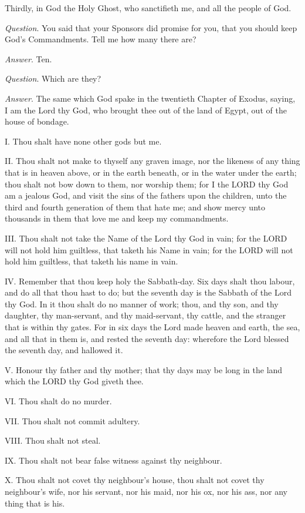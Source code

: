 Thirdly, in God the Holy Ghost, who sanctifieth me,
and all the people of God.

\emph{Question}. You said that your Sponsors did
promise for you, that you should keep God's Commandments. Tell me how
many there are?

\emph{Answer}. Ten.

\emph{Question}. Which are they?

\emph{Answer}. The same which God spake in the
twentieth Chapter of Exodus, saying, I am the Lord thy God, who brought
thee out of the land of Egypt, out of the house of bondage.

I. Thou shalt have none other gods but me.

II. Thou shalt not make to thyself any graven image,
nor the likeness of any thing that is in heaven above, or in the earth
beneath, or in the water under the earth; thou shalt not bow down to them,
nor worship them; for I the LORD thy God am a jealous
God, and visit the sins of the fathers upon the children, unto the third
and fourth generation of them that hate me; and show mercy unto thousands
in them that love me and keep my commandments.

III. Thou shalt not take the Name of the Lord thy God
in vain; for the LORD will not hold him guiltless,
that taketh his Name in vain; for the LORD will
not hold him guiltless, that taketh his name in vain.

IV. Remember that thou keep holy the Sabbath-day. Six
days shalt thou labour, and do all that thou hast to do; but the seventh
day is the Sabbath of the Lord thy God. In it thou shalt do no manner
of work; thou, and thy son, and thy daughter, thy man-servant, and thy
maid-servant, thy cattle, and the stranger that is within thy gates. For
in six days the Lord made heaven and earth, the sea, and all that in them
is, and rested the seventh day: wherefore the Lord blessed the seventh
day, and hallowed it.

V. Honour thy father and thy mother; that thy days may
be long in the land which the LORD thy God giveth
thee.

VI. Thou shalt do no murder.

VII. Thou shalt not commit adultery.

VIII. Thou shalt not steal.

IX. Thou shalt not bear false witness against thy neighbour.

X. Thou shalt not covet thy neighbour's house, thou
shalt not covet thy neighbour's wife, nor his servant, nor his maid, nor
his ox, nor his ass, nor any thing that is his.

